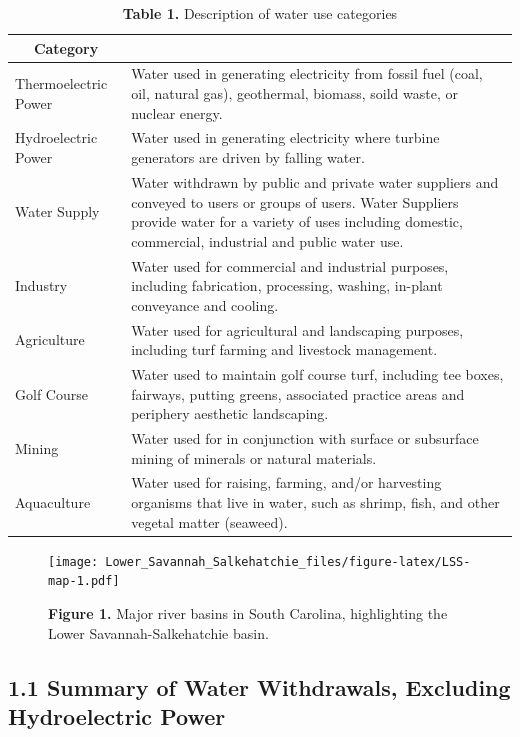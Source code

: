 \documentclass[
]{article}
\begin{document}
\begin{table}[!h]
\centering
\caption{\label{tab:water-use-cat-description}\textbf{Table 1.} Description of water use categories}
\centering
\begin{tabular}[t]{l>{\raggedright\arraybackslash}p{12 cm}}
\toprule
\multicolumn{1}{c}{Category} & \multicolumn{1}{>{\centering\arraybackslash}p{12 cm}}{Description}\\
\midrule
Thermoelectric Power & Water used in generating electricity from fossil fuel (coal, oil, natural gas), geothermal, biomass, soild waste, or nuclear energy.\\
Hydroelectric Power & Water used in generating electricity where turbine generators are driven by falling water.\\
Water Supply & Water withdrawn by public and private water suppliers and conveyed to users or groups of users. Water Suppliers provide water for a variety of uses including domestic, commercial, industrial and public water use.\\
Industry & Water used for commercial and industrial purposes, including fabrication, processing, washing, in-plant conveyance and cooling.\\
Agriculture & Water used for agricultural and landscaping purposes, including turf farming and livestock management.\\
Golf Course & Water used to maintain golf course turf, including tee boxes, fairways, putting greens, associated practice areas and periphery aesthetic landscaping.\\
Mining & Water used for in conjunction with surface or subsurface mining of minerals or natural materials.\\
Aquaculture & Water used for raising, farming, and/or harvesting organisms that live in water, such as shrimp, fish, and other vegetal matter (seaweed).\\
\bottomrule
\end{tabular}
\end{table}

\begin{figure}
\centering
\texttt{[image: Lower\_Savannah\_Salkehatchie\_files/figure-latex/LSS-map-1.pdf]}
\caption{\textbf{Figure 1.} Major river basins in South Carolina,
highlighting the Lower Savannah-Salkehatchie basin.}
\end{figure}

\hypertarget{summary-of-water-withdrawals-excluding-hydroelectric-power}{%
\subsection{1.1 Summary of Water Withdrawals, Excluding Hydroelectric
Power}\label{summary-of-water-withdrawals-excluding-hydroelectric-power}}
\end{document}
